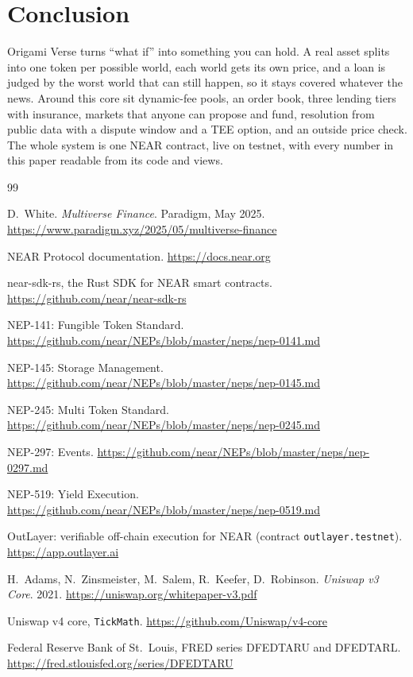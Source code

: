 \documentclass[11pt,a4paper]{article}
\newcommand{\code}[1]{\texttt{\small #1}}
\begin{document}
\section{Conclusion}

Origami Verse turns ``what if'' into something you can hold. A real asset splits into one token per possible world, each
world gets its own price, and a loan is judged by the worst world that can still happen, so it stays covered whatever
the news. Around this core sit dynamic-fee pools, an order book, three lending tiers with insurance, markets that
anyone can propose and fund, resolution from public data with a dispute window and a TEE option, and an outside
price check. The whole system is one NEAR contract, live on testnet, with every number in this paper readable from
its code and views.

\begin{thebibliography}{99}
\footnotesize\raggedright
\setlength{\itemsep}{0pt}
 D.~White. \emph{Multiverse Finance}. Paradigm, May 2025.
\url{https://www.paradigm.xyz/2025/05/multiverse-finance}

 NEAR Protocol documentation. \url{https://docs.near.org}

 near-sdk-rs, the Rust SDK for NEAR smart contracts. \url{https://github.com/near/near-sdk-rs}

 NEP-141: Fungible Token Standard. \url{https://github.com/near/NEPs/blob/master/neps/nep-0141.md}

 NEP-145: Storage Management. \url{https://github.com/near/NEPs/blob/master/neps/nep-0145.md}

 NEP-245: Multi Token Standard. \url{https://github.com/near/NEPs/blob/master/neps/nep-0245.md}

 NEP-297: Events. \url{https://github.com/near/NEPs/blob/master/neps/nep-0297.md}

 NEP-519: Yield Execution. \url{https://github.com/near/NEPs/blob/master/neps/nep-0519.md}

 OutLayer: verifiable off-chain execution for NEAR (contract \code{outlayer.testnet}).
\url{https://app.outlayer.ai}

 H.~Adams, N.~Zinsmeister, M.~Salem, R.~Keefer, D.~Robinson. \emph{Uniswap v3 Core}. 2021.
\url{https://uniswap.org/whitepaper-v3.pdf}

 Uniswap v4 core, \code{TickMath}. \url{https://github.com/Uniswap/v4-core}

 Federal Reserve Bank of St.\ Louis, FRED series DFEDTARU and DFEDTARL.
\url{https://fred.stlouisfed.org/series/DFEDTARU}

\end{thebibliography}
\end{document}
